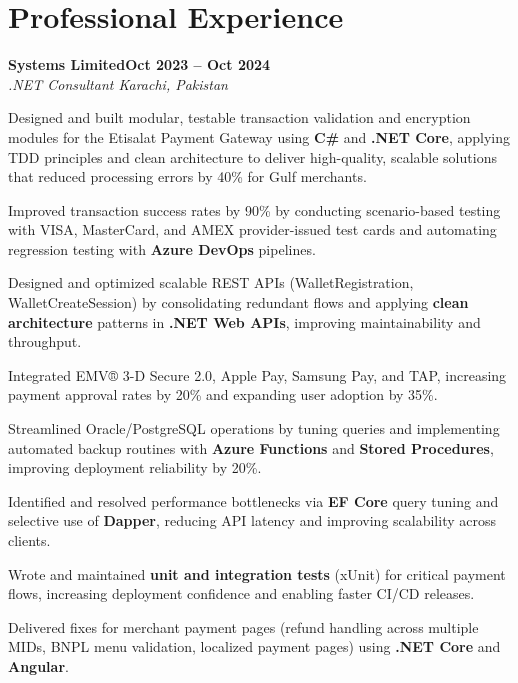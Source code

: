 \documentclass[letterpaper,10pt]{article}
\newcommand{\headingBf}[2]{
  \hspace{10pt}\textbf{#1}\hfill\textbf{#2}\\
}
\newcommand{\headingIt}[2]{
  \hspace{10pt}\textit{#1}\hfill\textit{#2}\\
}
\newenvironment{resume_list}{
  \vspace{-7pt}
  \begin{itemize}[itemsep=-2px, parsep=1pt, leftmargin=30pt]
}{
  \end{itemize}
}
\begin{document}
\section{Professional Experience}

\headingBf{Systems Limited}{Oct 2023 -- Oct 2024}
\headingIt{.NET Consultant \hfill Karachi, Pakistan}{}
\begin{resume_list}
    \item Designed and built modular, testable transaction validation and encryption modules for the Etisalat Payment Gateway using \textbf{C\#} and \textbf{.NET Core}, applying TDD principles and clean architecture to deliver high-quality, scalable solutions that reduced processing errors by 40\% for Gulf merchants.
    \item Improved transaction success rates by 90\% by conducting scenario-based testing with VISA, MasterCard, and AMEX provider-issued test cards and automating regression testing with \textbf{Azure DevOps} pipelines.
    \item Designed and optimized scalable REST APIs (WalletRegistration, WalletCreateSession) by consolidating redundant flows and applying \textbf{clean architecture} patterns in \textbf{.NET Web APIs}, improving maintainability and throughput.
    \item Integrated EMV® 3-D Secure 2.0, Apple Pay, Samsung Pay, and TAP, increasing payment approval rates by 20\% and expanding user adoption by 35\%.
    \item Streamlined Oracle/PostgreSQL operations by tuning queries and implementing automated backup routines with \textbf{Azure Functions} and \textbf{Stored Procedures}, improving deployment reliability by 20\%.
    \item Identified and resolved performance bottlenecks via \textbf{EF Core} query tuning and selective use of \textbf{Dapper}, reducing API latency and improving scalability across clients.
    \item Wrote and maintained \textbf{unit and integration tests} (xUnit) for critical payment flows, increasing deployment confidence and enabling faster CI/CD releases.
    \item Delivered fixes for merchant payment pages (refund handling across multiple MIDs, BNPL menu validation, localized payment pages) using \textbf{.NET Core} and \textbf{Angular}.
\end{resume_list}
\end{document}
